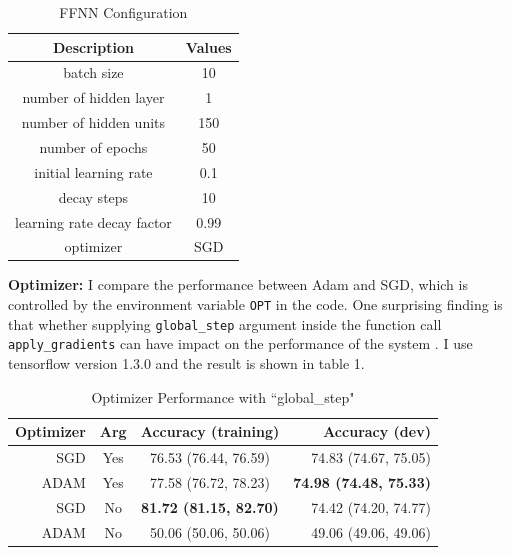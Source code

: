 \documentclass[11pt,a4paper]{article}
\begin{document}
\begin{table}
\captionsetup{size=footnotesize}
\caption{FFNN Configuration} \label{tab:freq}
\footnotesize\centering

\smallskip 
\begin{tabular*}{\columnwidth}{@{\extracolsep{\fill}}cc}
\toprule
  Description  & Values  \\
\midrule
 batch size & 10      \\
 number of hidden layer & 1 \\
 number of hidden units & 150        \\
 number of epochs & 50        \\
 initial learning rate & 0.1        \\
 decay steps & 10 \\
 learning rate decay factor & 0.99 \\
 optimizer & SGD \\
\bottomrule
\end{tabular*}
\end{table}

\textbf{Optimizer:} I compare the performance between Adam and SGD, which is controlled by
the environment variable \verb|OPT| in the code. One surprising finding is that whether 
supplying \verb|global_step| argument inside the function call \verb|apply_gradients| 
can have impact on the performance of the system . I use tensorflow version 1.3.0 and the result
is shown in table 1.

\begin{table}[!htb]
\captionsetup{size=footnotesize}
\caption{Optimizer Performance with ``global\_step"} \label{tab:freq}
\setlength\tabcolsep{0pt} %
\footnotesize\centering

\smallskip 
\begin{tabular*}{\columnwidth}{@{\extracolsep{\fill}}rccr}
\toprule
  Optimizer  & Arg & Accuracy (training) & Accuracy (dev) \\
\midrule
 SGD & Yes   & 76.53 (76.44, 76.59)    & 74.83 (74.67, 75.05)      \\
 ADAM & Yes   & 77.58 (76.72, 78.23)    & \textbf{74.98 (74.48, 75.33)}     \\
 SGD & No  & \textbf{81.72 (81.15, 82.70)}     & 74.42 (74.20, 74.77)      \\
 ADAM & No   & 50.06 (50.06, 50.06)     & 49.06 (49.06, 49.06)      \\
\bottomrule
\end{tabular*}
\end{table}
\end{document}
